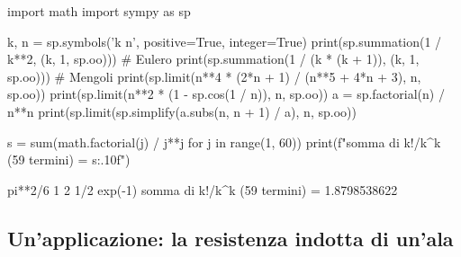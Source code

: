 \begin{python}
import math
import sympy as sp

k, n = sp.symbols('k n', positive=True, integer=True)
print(sp.summation(1 / k**2, (k, 1, sp.oo)))           # Eulero
print(sp.summation(1 / (k * (k + 1)), (k, 1, sp.oo)))  # Mengoli
print(sp.limit(n**4 * (2*n + 1) / (n**5 + 4*n + 3), n, sp.oo))
print(sp.limit(n**2 * (1 - sp.cos(1 / n)), n, sp.oo))
a = sp.factorial(n) / n**n
print(sp.limit(sp.simplify(a.subs(n, n + 1) / a), n, sp.oo))

s = sum(math.factorial(j) / j**j for j in range(1, 60))
print(f"somma di k!/k^k (59 termini) = {s:.10f}")
\end{python}
\begin{risultato}
pi**2/6
1
2
1/2
exp(-1)
somma di k!/k^k (59 termini) = 1.8798538622
\end{risultato}

\subsection{Un'applicazione: la resistenza indotta di un'ala}

